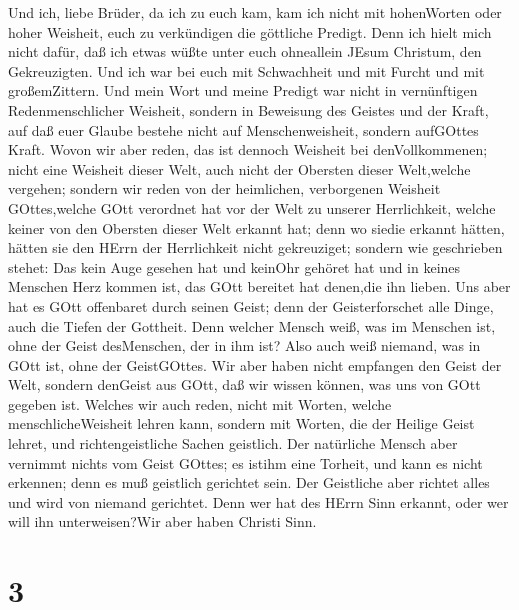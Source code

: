  Und ich, liebe Brüder, da ich zu euch kam, kam ich nicht
mit hohenWorten oder hoher Weisheit, euch zu verkündigen die göttliche
Predigt.  Denn ich hielt mich nicht dafür, daß ich etwas
wüßte unter euch ohneallein JEsum Christum, den Gekreuzigten.
 Und ich war bei euch mit Schwachheit und mit Furcht und mit
großemZittern.  Und mein Wort und meine Predigt war nicht in
vernünftigen Redenmenschlicher Weisheit, sondern in Beweisung des
Geistes und der Kraft,  auf daß euer Glaube bestehe nicht
auf Menschenweisheit, sondern aufGOttes Kraft.  Wovon wir
aber reden, das ist dennoch Weisheit bei denVollkommenen; nicht eine
Weisheit dieser Welt, auch nicht der Obersten dieser Welt,welche
vergehen;  sondern wir reden von der heimlichen, verborgenen
Weisheit GOttes,welche GOtt verordnet hat vor der Welt zu unserer
Herrlichkeit,  welche keiner von den Obersten dieser Welt
erkannt hat; denn wo siedie erkannt hätten, hätten sie den HErrn der
Herrlichkeit nicht gekreuziget;  sondern wie geschrieben
stehet: Das kein Auge gesehen hat und keinOhr gehöret hat und in keines
Menschen Herz kommen ist, das GOtt bereitet hat denen,die ihn lieben.
 Uns aber hat es GOtt offenbaret durch seinen Geist; denn
der Geisterforschet alle Dinge, auch die Tiefen der Gottheit.
 Denn welcher Mensch weiß, was im Menschen ist, ohne der
Geist desMenschen, der in ihm ist? Also auch weiß niemand, was in GOtt
ist, ohne der GeistGOttes.  Wir aber haben nicht empfangen
den Geist der Welt, sondern denGeist aus GOtt, daß wir wissen können,
was uns von GOtt gegeben ist.  Welches wir auch reden,
nicht mit Worten, welche menschlicheWeisheit lehren kann, sondern mit
Worten, die der Heilige Geist lehret, und richtengeistliche Sachen
geistlich.  Der natürliche Mensch aber vernimmt nichts vom
Geist GOttes; es istihm eine Torheit, und kann es nicht erkennen; denn
es muß geistlich gerichtet sein.  Der Geistliche aber
richtet alles und wird von niemand gerichtet.  Denn wer hat
des HErrn Sinn erkannt, oder wer will ihn unterweisen?Wir aber haben
Christi Sinn.

\hypertarget{section-2}{%
\section{3}\label{section-2}}

